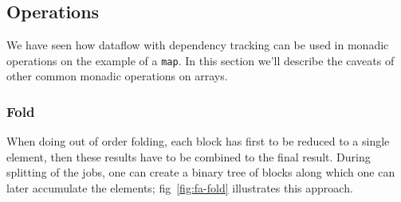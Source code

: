 \documentclass[runningheads,a4paper,fleqn]{llncs}
\begin{document}
\subsection{Operations}
We have seen how dataflow with dependency tracking can be used in
monadic operations on the example of a \texttt{map}. In this section
we'll describe the caveats of other common monadic operations on
arrays.

\subsubsection{Fold}
When doing out of order folding, each block has first to be reduced to
a single element, then these results have to be combined to the final
result. During splitting of the jobs, one can create a binary tree of
blocks along which one can later accumulate the elements;
fig~\ref{fig:fa-fold} illustrates this approach.
\end{document}
